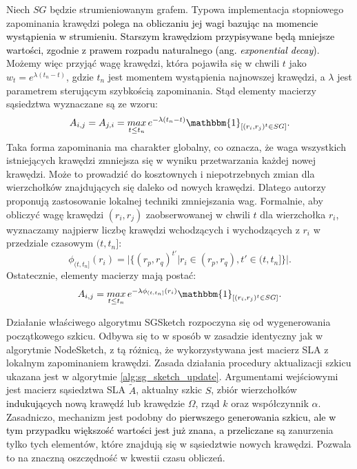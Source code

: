             Niech $SG$ będzie strumieniowanym grafem. Typowa implementacja stopniowego zapominania krawędzi \textcolor{black}{polega na obliczaniu jej wagi bazując na momencie wystąpienia w strumieniu. Starszym krawędziom przypisywane będą mniejsze wartości, zgodnie z prawem rozpadu naturalnego (ang. \textit{exponential decay})}. Możemy więc przyjąć wagę krawędzi, która pojawiła się w chwili $t$ jako $w_t = e^{\lambda(t_n - t)}$, gdzie $t_n$ jest momentem wystąpienia najnowszej krawędzi, a $\lambda$ jest parametrem sterującym szybkością zapominania. Stąd elementy macierzy sąsiedztwa wyznaczane są ze wzoru:
            \begin{equation} \label{eq:sg_sketch_1}  
                A_{i,j} = A_{j,i} = \mathop{max}_{t \leq t_n} e^{-\lambda (t_n - t)}\mathbbm{1}_{[(r_i, r_j)^{t} \in SG]}.
            \end{equation}
            Taka forma zapominania ma charakter globalny, co oznacza, że  waga wszystkich istniejących krawędzi zmniejsza się w wyniku przetwarzania każdej nowej krawędzi. Może to prowadzić do kosztownych i niepotrzebnych zmian dla wierzchołków znajdujących się daleko od nowych krawędzi. Dlatego autorzy proponują zastosowanie lokalnej techniki zmniejszania wag. Formalnie, aby obliczyć wagę krawędzi $(r_i, r_j)$ zaobserwowanej w chwili $t$ dla wierzchołka $r_i$, wyznaczamy najpierw liczbę krawędzi wchodzących i wychodzących z $r_i$ w przedziale czasowym $(t,t_n]$: 
            \begin{equation} \label{eq:sg_sketch_2}  
                \phi_{(t,t_n]}(r_i) = \vert \{(r_p, r_q)^{t'} \vert r_i \in (r_p, r_q), t' \in (t,t_n] \} \vert.
            \end{equation}
            Ostatecznie, elementy macierzy mają postać:
            \begin{equation} \label{eq:sg_sketch_3}  
                A_{i,j} = \mathop{max}_{t \leq t_n} e^{-\lambda \phi_{(t,t_n]}(r_i)}\mathbbm{1}_{[(r_i, r_j)^{t} \in SG]}.
            \end{equation}

            Działanie właściwego algorytmu SGSketch rozpoczyna się od wygenerowania początkowego szkicu. Odbywa się to w sposób w zasadzie identyczny jak w algorytmie NodeSketch, z tą różnicą, że wykorzystywana jest macierz SLA z lokalnym zapominaniem krawędzi. Zasada działania procedury aktualizacji szkicu ukazana jest w algorytmie \ref{alg:sg_sketch_update}. Argumentami wejściowymi jest macierz sąsiedztwa SLA $\tilde{A}$, aktualny szkic $S$, zbiór wierzchołków \textcolor{black}{indukujących} nową krawędź lub krawędzie $\Omega$, rząd $k$ oraz współczynnik $\alpha$. Zasadniczo, mechanizm jest podobny do \textcolor{black}{pierwszego generowania szkicu, ale w tym przypadku większość wartości jest już znana, a przeliczane są} zanurzenia tylko tych elementów, które znajdują się w sąsiedztwie nowych krawędzi. Pozwala to na znaczną oszczędność w kwestii czasu obliczeń. 

